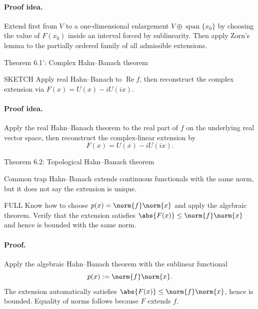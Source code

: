 \documentclass[header={Lecture 3 Exam Study Notes}]{study-note}
\begin{document}
\paragraph{Proof idea.}
Extend first from $V$ to a one-dimensional enlargement $V\oplus \operatorname{span}\{x_0\}$ by choosing the value of $F(x_0)$ inside an interval forced by sublinearity. Then apply Zorn's lemma to the partially ordered family of all admissible extensions.

\begin{thmbox}{Theorem 6.1': Complex Hahn--Banach theorem}
\thmHahnBanachComplex
\end{thmbox}

\begin{prooflevelbox}{SKETCH}
Apply real Hahn--Banach to $\operatorname{Re}f$, then reconstruct the complex extension via $F(x)=U(x)-iU(ix)$.
\end{prooflevelbox}

\paragraph{Proof idea.}
Apply the real Hahn--Banach theorem to the real part of $f$ on the underlying real vector space, then reconstruct the complex-linear extension by
\[
F(x)=U(x)-iU(ix).
\]

\begin{thmbox}{Theorem 6.2: Topological Hahn--Banach theorem}
\thmHahnBanachNormed
\end{thmbox}

\begin{warningbox}{Common trap}
Hahn--Banach extends continuous functionals with the same norm, but it does not say the extension is unique.
\end{warningbox}

\begin{prooflevelbox}{FULL}
Know how to choose $p(x)=\norm{f}\norm{x}$ and apply the algebraic theorem. Verify that the extension satisfies $\abs{F(x)}\le\norm{f}\norm{x}$ and hence is bounded with the same norm.
\end{prooflevelbox}

\paragraph{Proof.}
Apply the algebraic Hahn--Banach theorem with the sublinear functional
\[
p(x):=\norm{f}\norm{x}.
\]
The extension automatically satisfies $\abs{F(x)}\le \norm{f}\norm{x}$, hence is bounded. Equality of norms follows because $F$ extends $f$.
\end{document}
